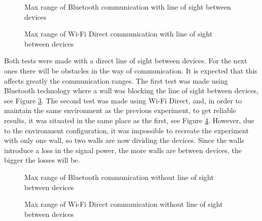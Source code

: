\begin{figure}[ht]
   \noindent{}
	\caption{\label{fig:btMaxVisib} Max range of Bluetooth communication with line of sight between devices}
\end{figure}

\begin{figure}[ht]
   \noindent{}
	\caption{\label{fig:wfdMaxVisib} Max range of Wi-Fi Direct communication with line of sight between devices}
\end{figure}

Both tests were made with a direct line of sight between devices. For the next ones there will be obstacles in the way of communication. It is expected that this affects greatly the communication ranges. The first test was made using Bluetooth technology where a wall was blocking the line of sight between devices, see Figure \ref{fig:btMaxInv}. The second test was made using Wi-Fi Direct, and, in order to maintain the same environment as the previous experiment, to get reliable results, it was situated in the same place as the first, see Figure \ref{fig:wfdMaxInv}. However, due to the environment configuration, it was impossible to recreate the experiment with only one wall, so two walls are now dividing the devices. Since the walls introduce a loss in the signal power, the more walls are between devices, the bigger the losses will be.

\begin{figure}[ht]
   \noindent{}
	\caption{\label{fig:btMaxInv} Max range of Bluetooth communication without line of sight between devices}
\end{figure}

\begin{figure}[ht]
   \noindent{}
	\caption{\label{fig:wfdMaxInv} Max range of Wi-Fi Direct communication without line of sight between devices}
\end{figure}

